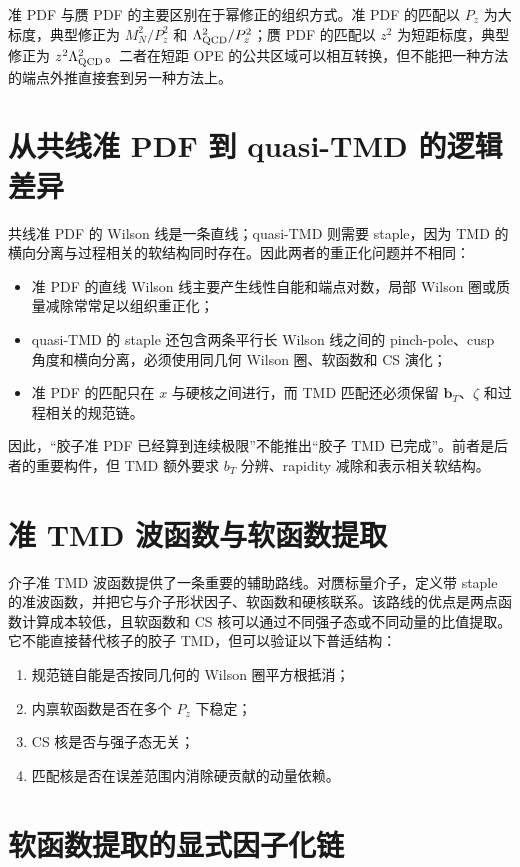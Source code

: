 \documentclass[UTF8,12pt,a4paper,twoside,openany]{ctexbook}
\newcommand{\bT}{\boldsymbol b_T}
\begin{document}
准 PDF 与赝 PDF 的主要区别在于幂修正的组织方式。准 PDF 的匹配以 \(P_z\) 为大标度，典型修正为 \(M_N^2/P_z^2\) 和 \(\Lambda_{\rm QCD}^2/P_z^2\)；赝 PDF 的匹配以 \(z^2\) 为短距标度，典型修正为 \(z^2\Lambda_{\rm QCD}^2\)。二者在短距 OPE 的公共区域可以相互转换，但不能把一种方法的端点外推直接套到另一种方法上\cite{Izubuchi2018,Cichy2019}。

\section{从共线准 PDF 到 quasi-TMD 的逻辑差异}

共线准 PDF 的 Wilson 线是一条直线；quasi-TMD 则需要 staple，因为 TMD 的横向分离与过程相关的软结构同时存在。因此两者的重正化问题并不相同：
\begin{itemize}
  \item 准 PDF 的直线 Wilson 线主要产生线性自能和端点对数，局部 Wilson 圈或质量减除常常足以组织重正化；
  \item quasi-TMD 的 staple 还包含两条平行长 Wilson 线之间的 pinch-pole、cusp 角度和横向分离，必须使用同几何 Wilson 圈、软函数和 CS 演化；
  \item 准 PDF 的匹配只在 \(x\) 与硬核之间进行，而 TMD 匹配还必须保留 \(\bT\)、\(\zeta\) 和过程相关的规范链。
\end{itemize}
因此，“胶子准 PDF 已经算到连续极限”不能推出“胶子 TMD 已完成”。前者是后者的重要构件，但 TMD 额外要求 \(b_T\) 分辨、rapidity 减除和表示相关软结构。

\section{准 TMD 波函数与软函数提取}

介子准 TMD 波函数提供了一条重要的辅助路线。对赝标量介子，定义带 staple 的准波函数，并把它与介子形状因子、软函数和硬核联系。该路线的优点是两点函数计算成本较低，且软函数和 CS 核可以通过不同强子态或不同动量的比值提取\cite{ZhangSoft2020,ChuCS2022}。它不能直接替代核子的胶子 TMD，但可以验证以下普适结构：
\begin{enumerate}
  \item 规范链自能是否按同几何的 Wilson 圈平方根抵消；
  \item 内禀软函数是否在多个 \(P_z\) 下稳定；
  \item CS 核是否与强子态无关；
  \item 匹配核是否在误差范围内消除硬贡献的动量依赖。
\end{enumerate}

\section{软函数提取的显式因子化链}
\end{document}
